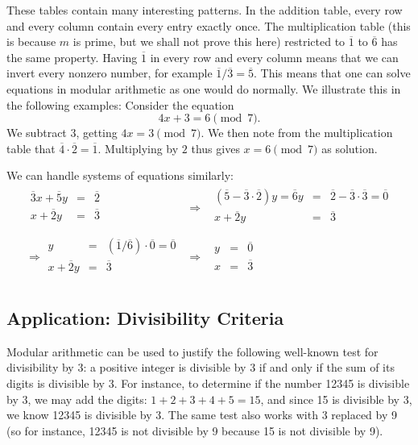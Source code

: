 These tables contain many interesting patterns. In the addition table, every row and
every column contain every entry exactly once. The multiplication table (this is because
$m$ is prime, but we shall not prove this here) restricted to $\overline{1}$ to $\overline{6}$ has the same property.
Having $\overline{1}$ in every row and every column means that we can invert every
nonzero number, for example $\overline{1}/\overline{3}=\overline{5}$. This means that
one can solve equations in modular arithmetic as one would do normally. We illustrate
this in the following examples:
\medskip
Consider the equation
\[
4x+3=6\pmod{7}.
\]
We subtract $3$, getting $4x=3\pmod{7}$. We then note from the multiplication table that
$\overline{4}\cdot\overline{2}=\overline{1}$. Multiplying by $2$ thus gives
$x=6\pmod{7}$ as solution.

We can handle systems of equations similarly:
\begin{eqnarray*}
\begin{array}{rcl}
\overline{3}x+\overline{5}y&=&\overline{2}\\
x+\overline{2}y&=&\overline{3}\\
\end{array}
&\Rightarrow&
\begin{array}{rcl}
(\overline{5}-\overline{3}\cdot\overline{2})y=\overline{6}y&=&\overline{2}-\overline{3}\cdot\overline{3}=\overline{0}\\
x+\overline{2}y&=&\overline{3}\\
\end{array}\\
\Rightarrow
\begin{array}{rcl}
y&=&(\overline{1}/\overline{6})\cdot\overline{0}=\overline{0}\\
x+\overline{2}y&=&\overline{3}\\
\end{array}
&\Rightarrow&
\begin{array}{rcl}
y&=&\overline{0}\\
x&=&\overline{3}\\
\end{array}
\end{eqnarray*}

\subsection{Application: Divisibility Criteria}


Modular arithmetic can be used to justify the following well-known test for divisibility by 3: a positive integer is divisible by 3 if and only if the sum of its digits is divisible by 3.  
For instance, to determine if the number 12345 is divisible by 3, we may add the digits: $1+2+3+4+5 = 15$, and since 15 is divisible by 3, we know 12345 is divisible by 3.
The same test also works with 3 replaced by 9 (so for instance, 12345 is not divisible by 9 because 15 is not divisible by 9).

